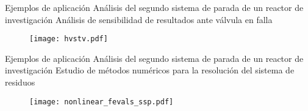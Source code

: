 \begin{frame}
{Ejemplos de aplicación}
{Análisis del segundo sistema de parada de un reactor de investigación}
Análisis de sensibilidad de resultados ante válvula en falla
\begin{figure}
\centering{}
\texttt{[image: hvstv.pdf]}
\end{figure}
\end{frame}







\begin{frame}
{Ejemplos de aplicación}
{Análisis del segundo sistema de parada de un reactor de investigación}
Estudio de métodos numéricos para la resolución del sistema de residuos
\begin{figure}
\centering{}
\texttt{[image: nonlinear\_fevals\_ssp.pdf]}
\end{figure}
\end{frame}








